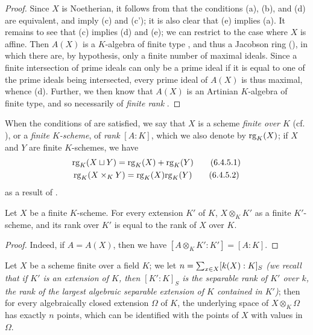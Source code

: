 \begin{proof}
\label{proof-1.6.4.4}
Since $X$ is Noetherian, it follows from  that the conditions (a), (b), and (d) are equivalent, and imply (c) and (c');
it is also clear that (e) implies (a).
It remains to see that (c) implies (d) and (e);
we can restrict to the case where $X$ is affine.
Then $A(X)$ is a $K$-algebra of finite type , and thus a Jacobson ring (\cite[p.~3-11 and 3-12]{I-1}), in which there are, by hypothesis, only a finite number of maximal ideals.
Since a finite intersection of prime ideals can only be a prime ideal if it is equal to one of the prime ideals being intersected, every prime ideal of $A(X)$ is thus maximal, whence (d).
Further, we then know  that $A(X)$ is an Artinian $K$-algebra of finite type, and so necessarily of \emph{finite rank} \cite{I-21}.
\end{proof}

\begin{env}[6.4.5]
\label{1.6.4.5}
When the conditions of  are satisfied, we say that $X$ is a scheme \emph{finite over $K$} (cf. ), or a \emph{finite $K$-scheme}, of \emph{rank} $[A:K]$, which we also denote by ${\mathop{\mathrm{rg}}}_K(X)$;
if $X$ and $Y$ are finite $K$-schemes, we have
\begin{gather*}
{\mathop{\mathrm{rg}}}_K(X\sqcup Y)={\mathop{\mathrm{rg}}}_K(X)+{\mathop{\mathrm{rg}}}_K(Y)\tag{6.4.5.1}\\
{\mathop{\mathrm{rg}}}_K(X\times_K Y)={\mathop{\mathrm{rg}}}_K(X){\mathop{\mathrm{rg}}}_K(Y)\tag{6.4.5.2}
\end{gather*}
as a result of .
\end{env}

\begin{cor}[6.4.6]
\label{1.6.4.6}
Let $X$ be a finite $K$-scheme.
For every extension $K'$ of $K$, $X\otimes_K K'$ as a finite $K'$-scheme, and its rank over $K'$ is equal to the rank of $X$ over $K$.
\end{cor}

\begin{proof}
\label{proof-1.6.4.6}
Indeed, if $A=A(X)$, then we have $[A\otimes_K K':K']=[A:K]$.
\end{proof}

\begin{cor}[6.4.7]
\label{1.6.4.7}
Let $X$ be a scheme finite over a field $K$;
we let $n=\sum_{x\in X}[k(X):K]_S$ \emph{(we recall that if $K'$ is an extension of $K$, then $[K':K]_S$ is the \emph{separable rank} of $K'$ over $k$, the rank of the largest algebraic separable extension of $K$ contained in $K'$)};
then
for every algebraically closed extension $\Omega$ of $K$, the underlying space of $X\otimes_K\Omega$ has exactly $n$ points, which can be identified with the points of $X$ with values in $\Omega$.
\end{cor}


